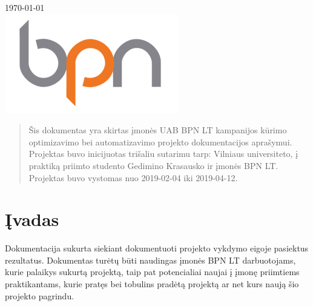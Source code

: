 \begin{titlepage}

{\large \today}\\[2cm] %


\includegraphics{Images/logo.png}\\[1cm] %
 

\vfill %

\end{titlepage}


\begin{abstract}
Šis dokumentas yra skirtas įmonės UAB BPN LT kampanijos kūrimo optimizavimo bei automatizavimo projekto dokumentacijos aprašymui. Projektas buvo inicijuotas trišaliu sutarimu tarp: Vilniaus universiteto, į praktiką priimto studento Gedimino Krasausko ir įmonės BPN LT. Projektas buvo vystomas nuo 2019-02-04 iki 2019-04-12.
\end{abstract}


\pagebreak
\tableofcontents


\pagebreak
\section{Įvadas}

Dokumentacija sukurta siekiant dokumentuoti projekto vykdymo eigoje pasiektus rezultatus. Dokumentas turėtų būti naudingas įmonės BPN LT darbuotojams, kurie palaikys sukurtą projektą, taip pat potencialiai naujai į įmonę priimtiems praktikantams, kurie pratęs bei tobulins pradėtą projektą ar net kurs naują šio projekto pagrindu.

